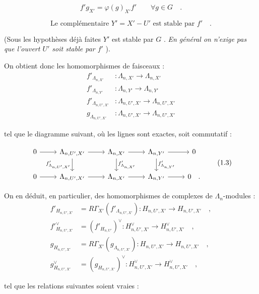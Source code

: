 \documentclass[11pt]{article}
\providecommand{\La}{\Lambda}
\begin{document}
\begin{equation}\tag{1.1}
f' g_{X'} = \varphi(g)_{X'} f' \qquad \forall g \in G \quad .
\end{equation}

\begin{equation}\tag{1.2}
\text{Le complémentaire } Y' = X' - U' \text{ est stable par } f' \quad .
\end{equation}

(Sous les hypothèses déjà faites $Y'$ est stable par $G$ . \emph{En général on n'exige pas que l'ouvert $U'$ soit stable par $f'$} ).

On obtient donc les homomorphismes de faisceaux :
\begin{align*}
f'_{\La_{n,X'}} &: \La_{n,X'} \longrightarrow \La_{n,X'} \\
f'_{\La_{n,Y'}} &: \La_{n,Y'} \longrightarrow \La_{n,Y'} \\
f'_{\La_{n,U',X'}} &: \La_{n,U',X'} \longrightarrow \La_{n,U',X'} \\
g_{\La_{n,U',X'}} &: \La_{n,U',X'} \longrightarrow \La_{n,U',X'}
\end{align*}

tel que le diagramme suivant, où les lignes sont exactes, soit commutatif :

\[
\begin{tikzcd}
0 \arrow[r] & \La_{n,U',X'} \arrow[r] \arrow[d, "f'_{\La_{n,U',X'}}"'] & \La_{n,X'} \arrow[r] \arrow[d, "f'_{\La_{n,X'}}"] & \La_{n,Y'} \arrow[r] \arrow[d, "f'_{\La_{n,Y'}}"] & 0 \\
0 \arrow[r] & \La_{n,U',X'} \arrow[r] & \La_{n,X'} \arrow[r] & \La_{n,Y'} \arrow[r] & 0 \quad .
\end{tikzcd}
\tag{1.3}
\]

On en déduit, en particulier, des homomorphismes de complexes de $\La_n$-modules :
\begin{align*}
f'_{H_{n,U',X'}} &= R\Gamma_{X'}(f'_{\La_{n,U',X'}}) : H_{n,U',X'} \longrightarrow H_{n,U',X'} \quad , \\
f'^\vee_{H_{n,U',X'}} &= (f'_{H_{n,U'}})^\vee : H_{n,U',X'}^\vee \longrightarrow H_{n,U',X'}^\vee \quad , \\
g_{H_{n,U',X'}} &= R\Gamma_{X'}(g_{\La_{n,U',X'}}) : H_{n,U',X'} \longrightarrow H_{n,U',X'} \quad , \\
g^\vee_{H_{n,U',X'}} &= (g_{H_{n,U',X'}})^\vee : H_{n,U',X'}^\vee \longrightarrow H_{n,U',X'}^\vee \quad ,
\end{align*}

tel que les relations suivantes soient vraies :
\end{document}
